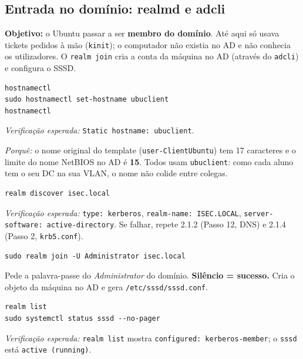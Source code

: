 
\subsection[Entrada no domínio: realmd e adcli]{Entrada no domínio: realmd e adcli}


\textbf{Objetivo:} o Ubuntu passar a ser \textbf{membro do domínio}. Até aqui só usava tickets pedidos à mão (\texttt{kinit}); o computador não existia no AD e não conhecia os utilizadores. O \texttt{realm join} cria a conta da máquina no AD (através do \texttt{adcli}) e configura o SSSD.


\begin{lstlisting}[style=bashstyle]
hostnamectl
sudo hostnamectl set-hostname ubuclient
hostnamectl
\end{lstlisting}

\emph{Verificação esperada:} \texttt{Static hostname: ubuclient}.

\emph{Porquê:} o nome original do template (\texttt{user-ClientUbuntu}) tem 17 caracteres e o limite do nome NetBIOS no AD é \textbf{15}. Todos usam \texttt{ubuclient}: como cada aluno tem o seu DC na sua VLAN, o nome não colide entre colegas.


\begin{lstlisting}[style=bashstyle]
realm discover isec.local
\end{lstlisting}

\emph{Verificação esperada:} \texttt{type: kerberos}, \texttt{realm-name: ISEC.LOCAL}, \texttt{server-software: active-directory}. Se falhar, repete 2.1.2 (Passo 12, DNS) e 2.1.4 (Passo 2, \texttt{krb5.conf}).


\begin{lstlisting}[style=bashstyle]
sudo realm join -U Administrator isec.local
\end{lstlisting}

Pede a palavra-passe do \emph{Administrator} do domínio. \textbf{Silêncio = sucesso.} Cria o objeto da máquina no AD e gera \texttt{/\allowbreak{}etc/\allowbreak{}sssd/\allowbreak{}sssd.conf}.


\begin{lstlisting}[style=bashstyle]
realm list
sudo systemctl status sssd --no-pager
\end{lstlisting}

\emph{Verificação esperada:} \texttt{realm list} mostra \texttt{configured: kerberos-member}; o \texttt{sssd} está \texttt{active (running)}.

